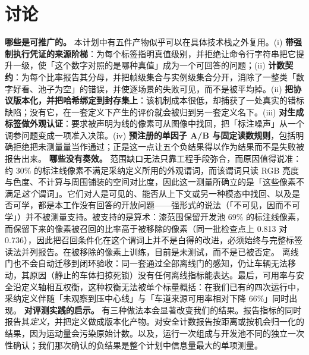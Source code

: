 \documentclass[journal]{IEEEtran}
\begin{document}
\section{讨论}
\textbf{哪些是可推广的。} 本计划中有五件产物似乎可以在具体技术栈之外复用。(i) \textbf{带强制执行凭证的来源阶梯}：为每个标签指明真值级别，并拒绝让命令行字符串把它提升一级，使「这个数字对照的是哪种真值」成为一个可回答的问题；(ii) \textbf{计数契约}：为每个比率报告其分母，并把帧级集合与实例级集合分开，消除了一整类「数字好看、池子为空」的错误，并使逐场景的失败可见，而不是被平均掉。(ii) \textbf{把协议版本化，并把哈希绑定到封存集上}：该机制成本很低，却捕获了一处真实的错标缺陷；没有它，在一套定义下产生的评价就会被归到另一套定义名下。(iii) \textbf{对生成标签做外观认证}：要求被声明为线的像素可从图像中找回，把「标注噪声」从一个调参问题变成一项准入决策。(iv) \textbf{预注册的单因子 A/B 与固定读数规则}，包括明确拒绝把未测量量当作通过；正是这一点让五个负结果得以作为结果而不是失败被报告出来。
\textbf{哪些没有奏效。} 范围缺口无法只靠工程手段弥合，而原因值得说准：约 30\% 的标注线像素不满足采纳定义所用的外观谓词，而该谓词只读 RGB 亮度与色度、不计算与周围铺装的空间对比度，因此这一测量所确立的是「这些像素不满足\emph{这个}谓词」。它们对人是可见的、能否从上下文或另一种模态中找回、以及是否可学，都是本工作没有回答的开放问题------强形式的说法（「不可见，因而不可学」）并不被测量支持。被支持的是算术：漆范围保留开发池 69\% 的标注线像素，而保留下来的像素被召回的比率高于被移除的像素（同一批检查点上 0.813 对 0.736），因此把召回条件化在这个谓词上并不是白得的改进，必须始终与完整标签读法并列报告。在被移除的像素上训练，目前是未测试，而不是已被否定。
离线门也不会自动迁移到闭环验收：同一套通过全部离线门的感知，仍让车辆无法移动，其原因（静止的车体扫掠死锁）没有任何离线指标能表达。最后，可用率与安全沿定义轴相互权衡，这种权衡无法被单个标量概括：在我们已有的四次运行中，采纳定义伴随「未观察到压中心线」与「车道来源可用率相对下降 66\%」同时出现。
\textbf{对评测实践的启示。} 有三种做法本会显著改变我们的结果。报告指标的同时报告其\emph{定义}，并把定义做成版本化产物。对安全计数报告按距离或按机会归一化的结果，因为运动量会污染原始计数。以及，运行一次组成与开发池不同的独立一次性确认；我们那次确认的负结果是整个计划中信息量最大的单项测量。
\end{document}
